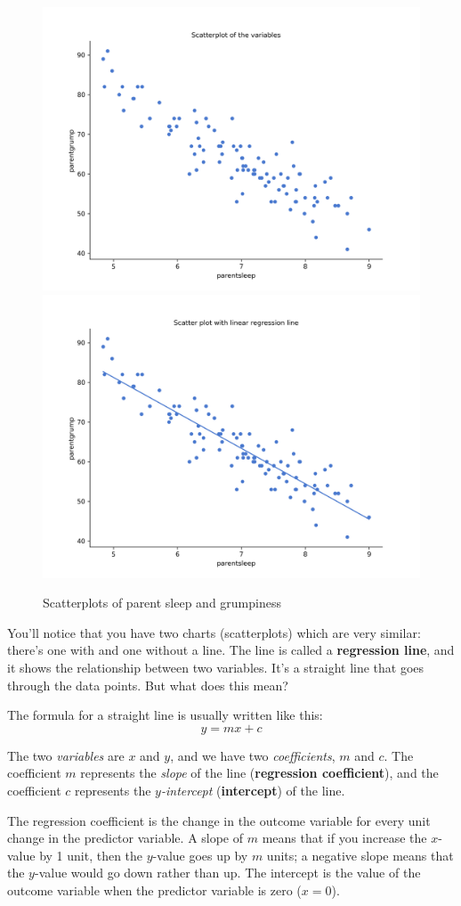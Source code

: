 \documentclass[
  11pt,
  a4paper,
  twoside,symmetric,openright]{book}
\theoremstyle{break}
\theoremstyle{break}
\begin{document}
\begin{figure}

{\centering \includegraphics[width=0.45\linewidth]{resources/image/parentsleepgrumpplotnolinreg} \includegraphics[width=0.45\linewidth]{resources/image/parentsleepgrumpplot} 

}

\caption{Scatterplots of parent sleep and grumpiness}\label{fig:parentscatters}
\end{figure}

You'll notice that you have two charts (scatterplots) which are very similar: there's one with and one without a line. The line is called a \textbf{regression line}, and it shows the relationship between two variables. It's a straight line that goes through the data points. But what does this mean?

The formula for a straight line is usually written like this:
\[
y = mx + c
\]

The two \emph{variables} are \(x\) and \(y\), and we have two \emph{coefficients}, \(m\) and \(c\). The coefficient \(m\) represents the \emph{slope} of the line (\textbf{regression coefficient}), and the coefficient \(c\) represents the \emph{\(y\)-intercept} (\textbf{intercept}) of the line.

The regression coefficient is the change in the outcome variable for every unit change in the predictor variable. A slope of \(m\) means that if you increase the \(x\)-value by 1 unit, then the \(y\)-value goes up by \(m\) units; a negative slope means that the \(y\)-value would go down rather than up. The intercept is the value of the outcome variable when the predictor variable is zero (\(x=0\)).
\end{document}
